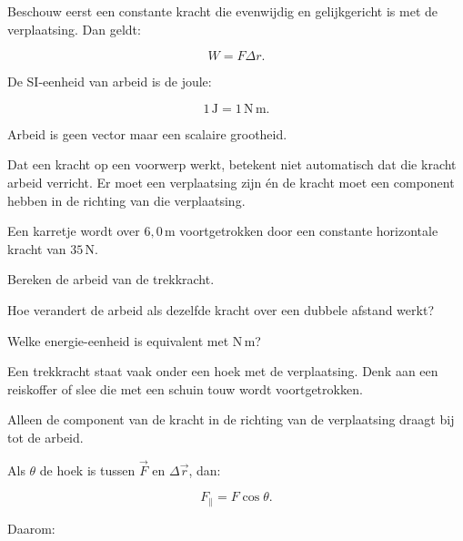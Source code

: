 \documentclass{ximera}
\begin{document}
Beschouw eerst een constante kracht die evenwijdig en gelijkgericht is met
de verplaatsing. Dan geldt:

\[
\boxed{W=F\Delta r.}
\]

De SI-eenheid van arbeid is de joule:

\[
\boxed{1\,\mathrm J=1\,\mathrm{N\,m}.}
\]

Arbeid is geen vector maar een scalaire grootheid.

\begin{opmerking}
Dat een kracht op een voorwerp werkt, betekent niet automatisch dat die kracht
arbeid verricht. Er moet een verplaatsing zijn én de kracht moet een component
hebben in de richting van die verplaatsing.
\end{opmerking}

\begin{oefening}{\oefB}

Een karretje wordt over $6{,}0\,\mathrm m$ voortgetrokken door een constante
horizontale kracht van $35\,\mathrm N$.

\begin{question}
Bereken de arbeid van de trekkracht.
\end{question}

\begin{question}
Hoe verandert de arbeid als dezelfde kracht over een dubbele afstand werkt?
\end{question}

\begin{question}
Welke energie-eenheid is equivalent met $\mathrm{N\,m}$?
\end{question}

\end{oefening}



Een trekkracht staat vaak onder een hoek met de verplaatsing. Denk aan een
reiskoffer of slee die met een schuin touw wordt voortgetrokken.

Alleen de component van de kracht in de richting van de verplaatsing draagt
bij tot de arbeid.

Als $\theta$ de hoek is tussen $\vec F$ en $\Delta\vec r$, dan:

\[
F_\parallel=F\cos\theta.
\]

Daarom:
\end{document}
